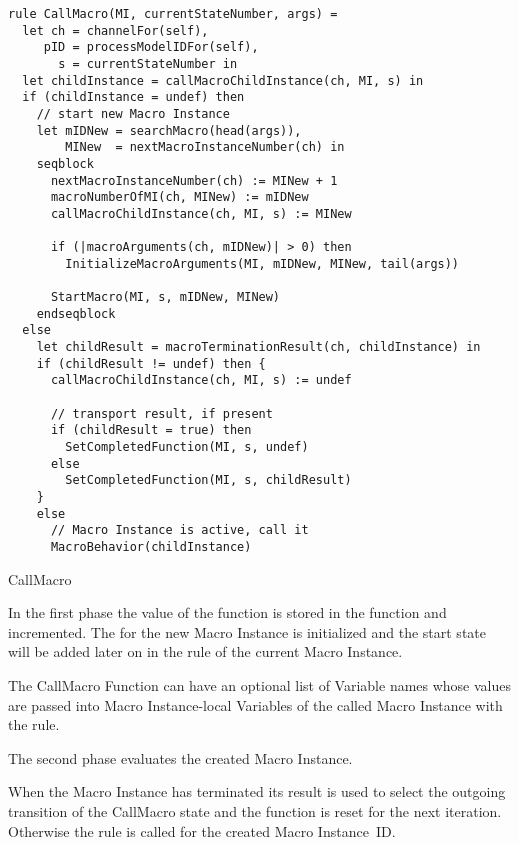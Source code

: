 \begin{listing}[htbp]
\begin{verbatim}
rule CallMacro(MI, currentStateNumber, args) =
  let ch = channelFor(self),
     pID = processModelIDFor(self),
       s = currentStateNumber in
  let childInstance = callMacroChildInstance(ch, MI, s) in
  if (childInstance = undef) then
    // start new Macro Instance
    let mIDNew = searchMacro(head(args)),
        MINew  = nextMacroInstanceNumber(ch) in
    seqblock
      nextMacroInstanceNumber(ch) := MINew + 1
      macroNumberOfMI(ch, MINew) := mIDNew
      callMacroChildInstance(ch, MI, s) := MINew

      if (|macroArguments(ch, mIDNew)| > 0) then
        InitializeMacroArguments(MI, mIDNew, MINew, tail(args))

      StartMacro(MI, s, mIDNew, MINew)
    endseqblock
  else
    let childResult = macroTerminationResult(ch, childInstance) in
    if (childResult != undef) then {
      callMacroChildInstance(ch, MI, s) := undef

      // transport result, if present
      if (childResult = true) then
        SetCompletedFunction(MI, s, undef)
      else
        SetCompletedFunction(MI, s, childResult)
    }
    else
      // Macro Instance is active, call it
      MacroBehavior(childInstance)
\end{verbatim}
\caption{CallMacro}
\label{lst:shortasm:CallMacro}
\end{listing}


In the first phase the value of the  function is stored in the  function and incremented. The  for the new Macro Instance is initialized and the start state will be added later on in the  rule of the current Macro Instance.

The CallMacro Function can have an optional list of Variable names whose values are passed into Macro Instance-local Variables of the called Macro Instance with the  rule.

The second phase evaluates the created Macro Instance.

When the Macro Instance has terminated its result is used to select the outgoing transition of the CallMacro state and the  function is reset for the next iteration. Otherwise the  rule is called for the created Macro Instance~ID.



